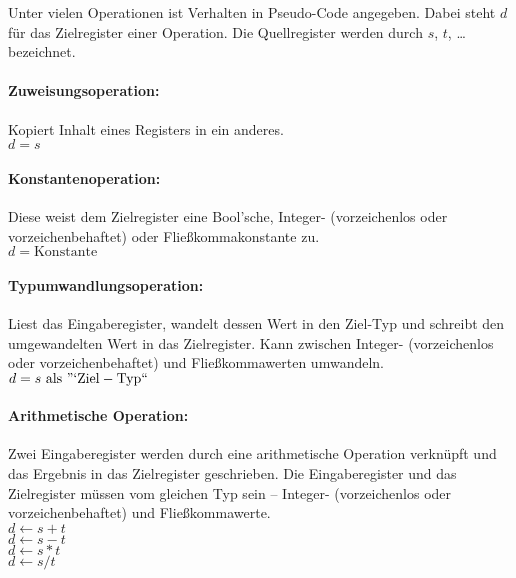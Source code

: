 \documentclass[twoside,a4paper,fleqn,12pt]{article}
\begin{document}
Unter vielen Operationen ist Verhalten in Pseudo-Code angegeben. Dabei steht $d$ für das Zielregister einer Operation.
Die Quellregister werden durch $s$, $t$, \dots bezeichnet. 

\paragraph{Zuweisungsoperation:} Kopiert Inhalt eines Registers in ein anderes.
\\\hspace*{1cm}$d = s$

\paragraph{Konstantenoperation:} Diese weist dem Zielregister eine Bool'sche, Integer- (vorzeichenlos oder vorzeichenbehaftet) oder
Fließkommakonstante zu.
\\\hspace*{1cm}$d = \mathrm{Konstante}$

\paragraph{Typumwandlungsoperation:} Liest das Eingaberegister, wandelt dessen Wert in den Ziel-Typ und schreibt den umgewandelten Wert in das Zielregister.
Kann zwischen Integer- (vorzeichenlos oder vorzeichenbehaftet) und Fließkommawerten umwandeln.
\\\hspace*{1cm}$d = s\ \mathrm{als}\ \mathrm{"`Ziel-Typ``}$

\paragraph{Arithmetische Operation:} Zwei Eingaberegister 
werden durch eine arithmetische Operation verknüpft und das Ergebnis in das Zielregister geschrieben.
Die Eingaberegister und das Zielregister müssen vom gleichen Typ sein -- Integer- (vorzeichenlos oder vorzeichenbehaftet) und Fließkommawerte.
\\\hspace*{1cm}$d \gets s + t$
\\\hspace*{1cm}$d \gets s - t$
\\\hspace*{1cm}$d \gets s * t$
\\\hspace*{1cm}$d \gets s / t$
\end{document}
